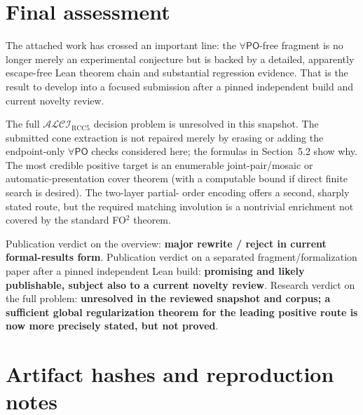 \documentclass[11pt]{article}
\newcommand{\Logic}{\ensuremath{\mathcal{ALCI}_{\mathrm{RCC5}}}}
\newcommand{\PO}{\ensuremath{\mathsf{PO}}}
\begin{document}
\section{Final assessment}

\begin{verdictbox}
The attached work has crossed an important line: the \(\forall\PO\)-free
fragment is no longer merely an experimental conjecture but is backed by a
detailed, apparently escape-free Lean theorem chain and substantial regression
evidence.  That is the result to develop into a focused submission after a
pinned independent build and current novelty review.

The full \Logic{} decision problem is unresolved in this snapshot.  The
submitted cone extraction is not repaired merely by erasing or adding the
endpoint-only \(\forall\PO\) checks considered here; the formulas in
Section~5.2 show why.  The most credible positive target is an enumerable
joint-pair/mosaic or automatic-presentation cover theorem (with a computable
bound if direct finite search is desired).  The two-layer partial-
order encoding offers a second, sharply stated route, but the required matching
involution is a nontrivial enrichment not covered by the standard FO\(^2\)
theorem.

Publication verdict on the overview: \textbf{major rewrite / reject in current
formal-results form}.  Publication verdict on a separated fragment/formalization
paper after a pinned independent Lean build: \textbf{promising and likely
publishable, subject also to a current novelty review}.  Research verdict on the
full problem: \textbf{unresolved in the reviewed snapshot and corpus; a
sufficient global regularization theorem for the leading positive route is now
more precisely stated, but not proved}.
\end{verdictbox}

\appendix

\section{Artifact hashes and reproduction notes}\label{app:repro}
\end{document}
